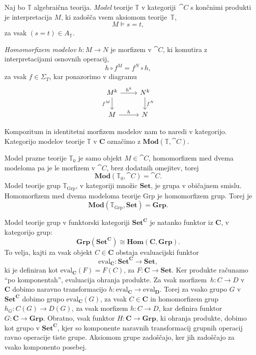 \documentclass[../kategoricna_logika.tex]{subfiles}
\begin{document}
%
\begin{definicija}
Naj bo $\mathbb{T}$ algebraična teorija.
\emph{Model} teorije $\mathbb{T}$ v kategoriji~$\cat{C}$ s
končnimi produkti je interpretacija $M$, ki zadošča vsem aksiomom
teorije~$\mathbb{T}$,
$$M \models s = t,$$
za vsak $(s = t) \in A_\mathbb{T}$.
\end{definicija}
%
\begin{definicija}
 \emph{Homomorfizem modelov} $h : M \to N$ je morfizem v
 $\cat{C}$, ki komutira z interpretacijami osnovnih operacij,
$$h \circ f^M = f^N \circ h,$$
za vsak $f \in \Sigma_T$, kar ponazorimo v diagramu
\begin{equation*}
  \begin{tikzcd}
    M^k \ar[d, "f^M"'] \ar[r, "h^k"] & N^k \ar[d, "f^N"] \\
    M \ar[r, "h"] & N
  \end{tikzcd}
\end{equation*}
\end{definicija}
Kompozitum in identitetni morfizem modelov nam to naredi v kategorijo.
Kategorijo modelov teorije $\mathbb{T}$ v $\mathbf{C}$ označimo z
$\mathbf{Mod}(\mathbb{T}, \cat{C})$.
%
\begin{primer}
  Model prazne teorije $\mathbb{T}_0$ je samo objekt $M \in \cat{C}$,
  homomorfizem med dvema modeloma pa je le morfizem v $\cat{C}$, brez
  dodatnih omejitev, torej
$$\mathbf{Mod}(\mathbb{T}_0, \cat{C}) = \cat{C}.$$
%
Model teorije grup $\mathbb{T}_{\mathrm{Grp}}$, v kategoriji množic
$\mathbf{Set}$, je grupa v običajnem smislu. Homomorfizem med dvema modeloma
teorije $\mathrm{Grp}$ je homomorfizem grup. Torej je
$$\mathbf{Mod}(\mathbb{T}_{\mathrm{Grp}}, \mathbf{Set}) = \mathbf{Grp}.$$
\end{primer}
% 
\begin{primer}
  Model teorije grup v funktorski kategoriji $\mathbf{Set}^{\mathbf{C}}$ je
  natanko funktor iz $\mathbf{C}$, v kategorijo grup:
  \[ \mathbf{Grp}(\mathbf{Set}^{\mathbf{C}}) \cong \mathbf{Hom}(\mathbf{C}, \mathbf{Grp}). \]
  To velja, kajti za vsak objekt $C \in \mathbf{C}$ obstaja evaluacijski
  funktor
  \[ \mathrm{eval}_{\mathbf{C}} : \mathbf{Set}^{\mathbf{C}} \to \mathbf{Set}, \]
  ki je definiran kot $\mathrm{eval}_{\mathbf{C}}(F) = F(C)$, za $F : \mathbf{C} \to \mathbf{Set}$.
  Ker produkte računamo "`po komponentah"', evaluacija ohranja produkte.
  Za vsak morfizem~${h : C \to D}$ v $\mathbf{C}$ dobimo naravno
  transformacijo $h : \mathrm{eval}_{\mathbf{C}} \to \mathrm{eval}_{\mathbf{D}}$.
  Torej za vsako grupo $G$ v $\mathbf{Set}^{\mathbf{C}}$ dobimo grupo
  $\mathrm{eval}_{\mathbf{C}}(G)$, za vsak $C \in \mathbf{C}$ in homomorfizem grup
  $h_{G} : C(G) \to D(G)$, za vsak morfizem $h : C \to D$,
  kar definira funktor $G : \mathbf{C} \to \mathbf{Grp}$.
  Obratno, vsak funktor $H : \mathbf{C} \to \mathbf{Grp}$, ki ohranja produkte,
  dobimo kot grupo v $\mathbf{Set}^{\mathbf{C}}$, kjer so komponente
  naravnih transformacij grupnih operacij ravno operacije tiste grupe.
  Aksiomom grupe zadoščajo, ker jih zadoščajo za vsako komponento posebej.
\end{primer}
%
\end{document}

